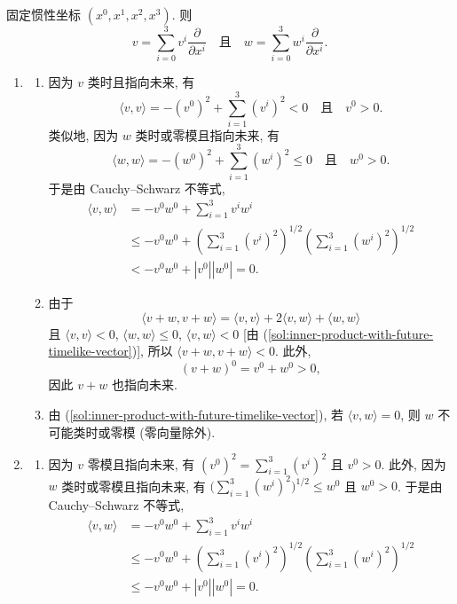 \begin{description}[font=\normalfont,leftmargin=2em,labelwidth=1.5em]
固定惯性坐标 $(x^0,x^1,x^2,x^3)$. 则
\[
  v=\sum_{i=0}^3v^i\frac{\partial}{\partial x^i}
  \quad\text{且}\quad w=\sum_{i=0}^3w^i\frac{\partial}{\partial x^i}.
\]
\begin{enumerate}[label=(\alph*),ref=\alph*,leftmargin=*]
\item
\begin{enumerate}[label=(\roman*),ref=\roman*,leftmargin=*]
\item\label{sol:inner-product-with-future-timelike-vector} 因为 $v$ 类时且指向未来, 有
\[
  \langle v,v\rangle=-(v^0)^2+\sum_{i=1}^3(v^i)^2<0\quad\text{且}\quad v^0>0.
\]
类似地, 因为 $w$ 类时或零模且指向未来, 有
\[
  \langle w,w\rangle=-(w^0)^2+\sum_{i=1}^3(w^i)^2\le0\quad\text{且}\quad w^0>0.
\]
于是由 Cauchy–Schwarz 不等式,
\begin{align*}
  \langle v,w\rangle&=-v^0w^0+\sum_{i=1}^3v^iw^i\\
  &\le -v^0w^0+\left(\sum_{i=1}^3(v^i)^2\right)^{1/2}\left(\sum_{i=1}^3(w^i)^2\right)^{1/2}\\
  &<-v^0w^0+|v^0||w^0|=0.
\end{align*}
\item 由于
\[
  \langle v+w,v+w\rangle=\langle v,v\rangle+2\langle v,w\rangle+\langle w,w\rangle
\]
且 $\langle v,v\rangle<0$, $\langle w,w\rangle\le0$, $\langle v,w\rangle<0$ [由 (\ref{sol:inner-product-with-future-timelike-vector})], 所以 $\langle v+w,v+w\rangle<0$. 此外,
\[
  (v+w)^0=v^0+w^0>0,
\]
因此 $v+w$ 也指向未来.
\item 由 (\ref{sol:inner-product-with-future-timelike-vector}), 若 $\langle v,w\rangle=0$, 则 $w$ 不可能类时或零模 (零向量除外).
\end{enumerate}
\item
\begin{enumerate}[label=(\roman*),ref=\roman*,leftmargin=*]
\item\label{sol:inner-product-with-future-null-vector} 因为 $v$ 零模且指向未来, 有 $(v^0)^2=\sum_{i=1}^3(v^i)^2$ 且 $v^0>0$. 此外, 因为 $w$ 类时或零模且指向未来, 有 $\bigl(\sum_{i=1}^3(w^i)^2\bigr)^{1/2}\le w^0$ 且 $w^0>0$. 于是由 Cauchy–Schwarz 不等式,
\begin{align*}
  \langle v,w\rangle&=-v^0w^0+\sum_{i=1}^3v^iw^i\\
  &\le -v^0w^0+\left(\sum_{i=1}^3(v^i)^2\right)^{1/2}\left(\sum_{i=1}^3(w^i)^2\right)^{1/2}\\
  &\le-v^0w^0+|v^0||w^0|=0.
\end{align*}

\end{enumerate}
\end{enumerate}
\end{description}
